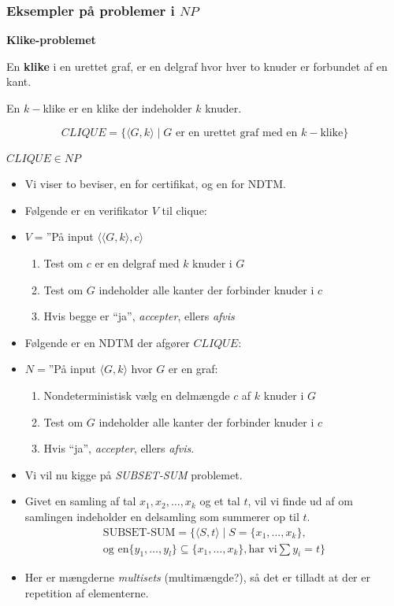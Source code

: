 \begin{frame}[allowframebreaks]
	\frametitle{Eksempler på problemer i $NP$}

	\item \textbf{Klike-problemet}
	\item En \textbf{klike} i en urettet graf, er en delgraf hvor hver to knuder er forbundet af en kant.
	\item En $k-$klike er en klike der indeholder $k$ knuder.

	\begin{equation}
		CLIQUE = \{\langle G, k \rangle \mid G \text{ er en urettet graf med en }k-\text{klike}\}
	\end{equation}

	\begin{theorem}
		$CLIQUE \in NP$
	\end{theorem}
	\begin{itemize}
		\item Vi viser to beviser, en for certifikat, og en for NDTM.
		\item Følgende er en verifikator $V$ til clique:
		\item $V = $''På input \(\langle \langle G, k \rangle , c \rangle \)
		      \begin{enumerate}
			      \item Test om $c$ er en delgraf med $k$ knuder i $G$
			      \item Test om $G$ indeholder alle kanter der forbinder knuder i $c$
			      \item Hvis begge er ``ja'', \textit{accepter}, ellers \textit{afvis}
		      \end{enumerate}
		\item Følgende er en NDTM der afgører $CLIQUE$:
		\item $N = $''På input $\langle G , k \rangle $ hvor $G$ er en graf:
		      \begin{enumerate}
			      \item Nondeterministisk vælg en delmængde $c$ af $k$ knuder i $G$
			      \item Test om $G$ indeholder alle kanter der forbinder knuder i $c$
			      \item Hvis ``ja'', \textit{accepter}, ellers \textit{afvis}.
		      \end{enumerate}

		\item Vi vil nu kigge på \textit{SUBSET-SUM} problemet.
		\item Givet en samling af tal $x_{1}, x_{2}, \ldots, x_{k}$ og et tal $t$, vil vi finde ud af om samlingen indeholder en delsamling som summerer op til $t$.
		      \begin{align*}
			      \text{SUBSET-SUM} = \{\langle S , t \rangle \mid S = \{x_{1}, \ldots, x_{k}\}, \\
			      \text{og en} \{y_{1}, \ldots, y_{l}\} \subseteq \{x_{1}, \ldots, x_{k}\}, \text{har vi} \sum{y_{i}}= t\}
		      \end{align*}
		\item Her er mængderne \textit{multisets} (multimængde?), så det er tilladt at der er repetition af elementerne.
	\end{itemize}


\end{frame}
